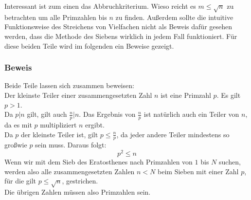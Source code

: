 	\noindent Interessant ist zum einen das Abbruchkriterium. Wieso reicht es $m\leq \sqrt{n}$ zu betrachten um alle Primzahlen bis $n$ zu finden. Au\ss erdem sollte die intuitive Funktionsweise des Streichens von Vielfachen nicht als Beweis daf\"ur gesehen werden, dass die Methode des Siebens wirklich in jedem Fall funktioniert. F\"ur diese beiden Teile wird im folgenden ein Beweise gezeigt.

	\subsubsection{Beweis}
	Beide Teile lassen sich zusammen beweisen:\\
	Der kleinste Teiler einer zusammengesetzten Zahl $n$ ist eine Primzahl $p$. Es gilt $p>1$.\\
	Da $p | n$ gilt, gilt auch $\frac{n}{p}|n$. Das Ergebnis von $\frac{n}{p}$ ist nat\"urlich auch ein Teiler von $n$, da es mit $p$ multipliziert $n$ ergibt.\\
	Da $p$ der kleinste Teiler ist, gilt $p \leq \frac{n}{p}$, da jeder andere Teiler mindestens so gro\ss wie $p$ sein muss. Daraus folgt: 
	\[p^2 \leq n\]	
	Wenn wir mit dem Sieb des Eratosthenes nach Primzahlen von $1$ bis $N$ suchen, werden also
	alle zusammengesetzten Zahlen $n < N$  beim Sieben mit einer Zahl $p$, f\"ur die gilt $p \leq \sqrt{n}$, gestrichen.\\
	Die \"ubrigen Zahlen m\"ussen also Primzahlen sein.
